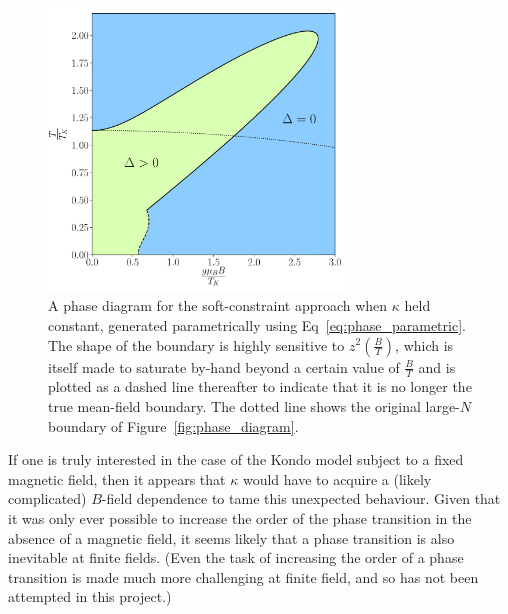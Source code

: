 \begin{figure}
\centering
\includegraphics[width=0.7\textwidth]{Figures/new_phase_diagram.pdf}
\caption{A phase diagram for the soft-constraint approach when $ \kappa $ held constant, generated parametrically using Eq~\eqref{eq:phase_parametric}. The shape of the boundary is highly sensitive to $ z^2(\frac{B}{T}) $, which is itself made to saturate by-hand beyond a certain value of $ \frac{B}{T}$ and is plotted as a dashed line thereafter to indicate that it is no longer the true mean-field boundary. The dotted line shows the original large-$N$ boundary of Figure~\ref{fig:phase_diagram}.}
\label{fig:new_phase_boundary}
\end{figure}

If one is truly interested in the case of the Kondo model subject to a fixed magnetic field, then it appears that $ \kappa $ would have to acquire a (likely complicated) $B$-field dependence to tame this unexpected behaviour. Given that it was only ever possible to increase the order of the phase transition in the absence of a magnetic field, it seems likely that a phase transition is also inevitable at finite fields. (Even the task of increasing the order of a phase transition is made much more challenging at finite field, and so has not been attempted in this project.)





